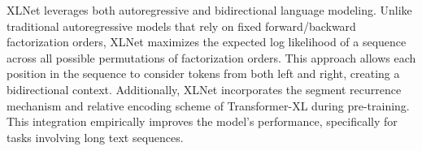 

XLNet \citep{yang2019xlnet} leverages both autoregressive and bidirectional language modeling. Unlike traditional autoregressive models that rely on fixed forward/backward factorization orders, XLNet maximizes the expected log likelihood of a sequence across all possible permutations of factorization orders. This approach allows each position in the sequence to consider tokens from both left and right, creating a bidirectional context. Additionally, XLNet incorporates the segment recurrence mechanism and relative encoding scheme of Transformer-XL during pre-training. This integration empirically improves the model's performance, specifically for tasks involving long text sequences. 






